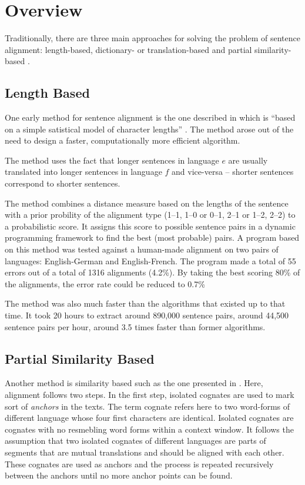 \section{Overview}
\label{sec:overview_senalign}
Traditionally, there are three main approaches for solving the problem of sentence alignment:  length-based, dictionary- or translation-based and partial similarity-based \autocite{hunalign}. 

\subsection{Length Based}
One early method for sentence alignment is the one described in \cite{gale-church-1991-program} which is \enquote{based on a simple satistical model of character lengths} \autocite{gale-church-1991-program}. The method arose out of the need to design a faster, computationally more efficient algorithm\footnotemark.


The method uses the fact that longer sentences in language \(e\) are usually translated into longer sentences in language \(f\) and vice-versa -- shorter sentences correspond to shorter sentences.

The method combines a distance measure based on the lengths of the sentence with a prior probility of the alignment type (1--1, 1--0 or 0--1, 2--1 or 1--2, 2--2) to a probabilistic score. 
It assigns this score to possible sentence pairs in a dynamic programming framework to find the best (most probable) pairs. 
A program based on this method was tested against a human-made alignment on two pairs of languages: English-German and English-French. 
The program made a total of 55 errors out of a total of 1316 alignments (4.2\%). 
By taking the best scoring 80\% of the alignments, the error rate could be reduced to 0.7\%

The method was also much faster than the algorithms that existed up to that time. 
It took 20 hours to extract around 890,000 sentence pairs, around 44,500 sentence pairs per hour, around 3.5 times faster than former algorithms.

\subsection{Partial Similarity Based}
Another method is similarity based such as the one presented in \cite{simard-plamondon-1996-bilingual}. 
Here, alignment follows two steps. 
In the first step, isolated cognates are used to mark sort of \emph{anchors} in the texts. 
The term cognate refers here to two word-forms of different language whose four first characters are identical. 
Isolated cognates are cognates with no resmebling word forms within a context window.
It follows the assumption that two isolated cognates of different languages are parts of segments that are mutual translations and should be aligned with each other. 
These cognates are used as anchors and the process is repeated recursively between the anchors until no more anchor points can be found.

